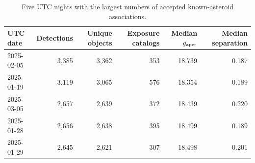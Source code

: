 \begin{table}
\centering
\caption{Five UTC nights with the largest numbers of accepted known-asteroid associations.}
\label{tab:nightly_top5}
\small
\begin{tabular}{@{}lrrrrr@{}}
\toprule
UTC date & Detections & Unique objects & Exposure catalogs & Median $g_{\rm aper}$ & Median separation \\
\midrule
2025-02-05 & 3,385 & 3,362 & 353 & 18.739 & 0.187 \\
2025-01-19 & 3,119 & 3,065 & 576 & 18.354 & 0.189 \\
2025-03-05 & 2,657 & 2,639 & 372 & 18.439 & 0.220 \\
2025-01-28 & 2,656 & 2,638 & 395 & 18.499 & 0.189 \\
2025-01-29 & 2,645 & 2,621 & 307 & 18.498 & 0.201 \\
\bottomrule
\end{tabular}
\end{table}
